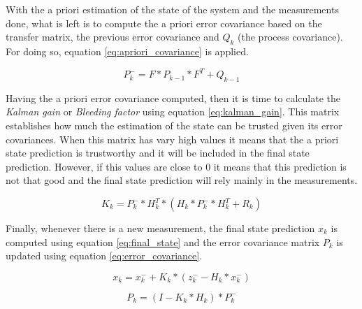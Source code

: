With the a priori estimation of the state of the system and the measurements done, what is left is to compute the a priori error covariance \cite{OReilly} based on the transfer matrix, the previous error covariance and $Q_{k}$ (the process covariance). For doing so, equation \ref{eq:apriori_covariance} is applied.

\begin{equation}
P_{k}^{-}=F*P_{k-1}*F^{T}+Q_{k-1}
\label{eq:apriori_covariance}
\end{equation}

Having the a priori error covariance computed, then it is time to calculate the \emph{Kalman gain} or \emph{Bleeding factor} using equation \ref{eq:kalman_gain}. This matrix establishes how much the estimation of the state can be trusted given its error covariances. When this matrix has vary high values it means that the a priori state prediction is trustworthy and it will be included in the final state prediction. However, if this values are close to 0 it means that this prediction is not that good and the final state prediction will rely mainly in the measurements.

\begin{equation}
K_{k}=P_{k}^{-}*H_{k}^{T}*(H_{k}*P_{k}^{-}*H_{k}^{T}+R_{k})
\label{eq:kalman_gain}
\end{equation}

Finally, whenever there is a new measurement, the final state prediction $x_{k}$ is computed using equation \ref{eq:final_state} and the error covariance matrix $P_{k}$ is updated using equation \ref{eq:error_covariance}.

\begin{equation}
x_{k}=x_{k}^{-}+K_{k}*(z_{k}^{-}-H_{k}*x_{k}^{-})
\label{eq:final_state}
\end{equation}

\begin{equation}
P_{k}=(I-K_{k}*H_{k})*P_{k}^{-}
\label{eq:error_covariance}
\end{equation}


